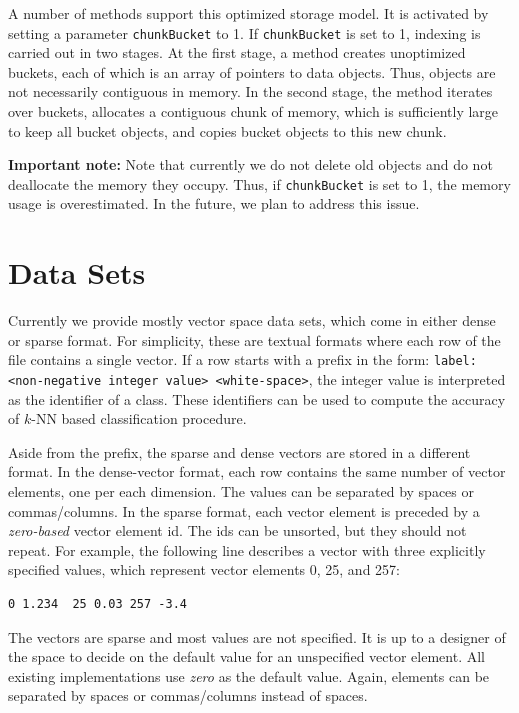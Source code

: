 \documentclass[runningheads,a4paper]{llncs}
\newcommand{\todonoteinline}[1]{\todo[color=red!40,inline,caption={TODO}]{#1}}
\newcommand{\ttt}[1]{\texttt{#1}}
\newcommand{\knn}{$k$-NN }
\begin{document}
A number of methods support this optimized storage model.
It is activated by setting a parameter \ttt{chunkBucket} to 1.
If \ttt{chunkBucket} is set to 1, indexing is carried out in two stages.
At the first stage, a method creates unoptimized buckets,
each of which is an array of pointers to data objects.
Thus, objects are not necessarily contiguous in memory.
In the second stage, the method iterates over buckets,
allocates a contiguous chunk of memory,
which is sufficiently large to keep all bucket objects,
and copies bucket objects to this new chunk.

\textbf{Important note:}
Note that currently we do not delete old objects and do not deallocate the memory 
they occupy. Thus, 
if 
\ttt{chunkBucket} is set to 1,
the memory usage is overestimated.
In the future, we plan to address this issue.

\section{Data Sets}
\label{SectionDatasets}
Currently we provide mostly vector space data sets,
which come in either dense or sparse format.
For simplicity, these are textual formats where each row of the file contains a single vector.
If a row starts with a prefix in the form: \ttt{label:<non-negative integer value> <white-space>},
the integer value is interpreted as the identifier of a class.
These identifiers can be used to compute the accuracy of \knn based classification procedure.

Aside from the prefix, the sparse and dense vectors are stored in a different format.
In the dense-vector format, each row
contains the same number of vector elements, one per each dimension.
The values can be separated by spaces or commas/columns.
In the sparse format, each vector element is preceded
by a \emph{zero-based} vector element id. 
The ids can be unsorted, but they should not repeat.
For example, the following line
describes a vector with three explicitly specified values,
which represent vector elements 0, 25, and 257:
\begin{verbatim}
0 1.234  25 0.03 257 -3.4 
\end{verbatim}

The vectors are sparse and most values are not specified.
It is up to a designer of the space to decide on the default value for an unspecified vector element.
All existing implementations use \emph{zero} as the default value.
Again, elements can be separated by spaces or commas/columns instead of spaces.
\end{document}
